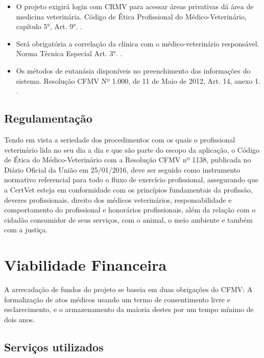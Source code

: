 \documentclass[
    12pt,               %
    openright,          %
    oneside,
    a4paper,            %
    BIBLATEX,           %
    TODO,               %
    english,            %
    brazil              %
    ]{ifsp-spo-inf-ctds}
\begin{document}
            \begin{itemize}

                \item O projeto exigirá login com CRMV para acessar áreas privativas dá área de medicina veterinária. Código de Ética Profissional do Médico-Veterinário, capítulo 5°, Art. 9°. .

                \item Será obrigatória a correlação da clínica com o médico-veterinário responsável. Norma Técnica Especial Art. 3°. .

                \item Os métodos de eutanásia disponíveis no preenchimento das informações do sistema. Resolução CFMV Nº 1.000, de 11 de Maio de 2012, Art. 14, anexo 1. .

            \end{itemize}            

        \subsection{Regulamentação}

            Tendo em vista a seriedade dos procedimentos com os quais o profissional veterinário lida no seu dia a dia e que são parte do escopo da aplicação, o Código de Ética do Médico-Veterinário com a Resolução CFMV nº 1138, publicada no Diário Oficial da União em 25/01/2016, deve ser seguido como instrumento normativo referencial para todo o fluxo de exercício profissional, assegurando que a CertVet esteja em conformidade com os princípios fundamentais da profissão, deveres profissionais, direito dos médicos veterinários, responsabilidade e comportamento do profissional e honorários profissionais, além da relação com o cidadão consumidor de seus serviços, com o animal, o meio ambiente e também com a justiça.  

    \section{Viabilidade Financeira}

        A arrecadação de fundos do projeto se baseia em duas obrigações do CFMV: A formalização de atos médicos usando um termo de consentimento livre e esclarecimento, e o armazenamento da maioria destes por um tempo mínimo de dois anos.

        \subsection{Serviços utilizados}
\end{document}
